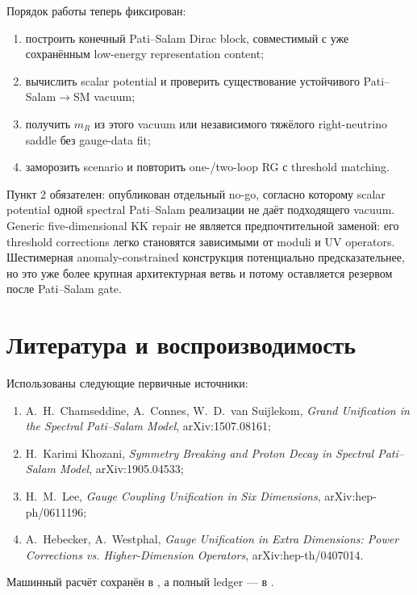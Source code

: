 Порядок работы теперь фиксирован:
\begin{enumerate}
 \item построить конечный Pati--Salam Dirac block, совместимый с уже
 сохранённым low-energy representation content;
 \item вычислить scalar potential и проверить существование устойчивого
 Pati--Salam\(\to\)SM vacuum;
 \item получить \(m_R\) из этого vacuum или независимого тяжёлого
 right-neutrino saddle без gauge-data fit;
 \item заморозить scenario и повторить one-/two-loop RG с threshold matching.
\end{enumerate}

Пункт 2 обязателен: опубликован отдельный no-go, согласно которому scalar
potential одной spectral Pati--Salam реализации не даёт подходящего vacuum.
Generic five-dimensional KK repair не является предпочтительной заменой:
его threshold corrections легко становятся зависимыми от moduli и UV
operators. Шестимерная anomaly-constrained конструкция потенциально
предсказательнее, но это уже более крупная архитектурная ветвь и потому
оставляется резервом после Pati--Salam gate.

\section{Литература и воспроизводимость}

Использованы следующие первичные источники:
\begin{enumerate}
 \item A.~H.~Chamseddine, A.~Connes, W.~D.~van Suijlekom,
 \emph{Grand Unification in the Spectral Pati--Salam Model},
 arXiv:1507.08161;
 \item H.~Karimi Khozani,
 \emph{Symmetry Breaking and Proton Decay in Spectral Pati--Salam Model},
 arXiv:1905.04533;
 \item H.~M.~Lee, \emph{Gauge Coupling Unification in Six Dimensions},
 arXiv:hep-ph/0611196;
 \item A.~Hebecker, A.~Westphal,
 \emph{Gauge Unification in Extra Dimensions: Power Corrections vs.
 Higher-Dimension Operators}, arXiv:hep-th/0407014.
\end{enumerate}

Машинный расчёт сохранён в
, а полный ledger --- в
.